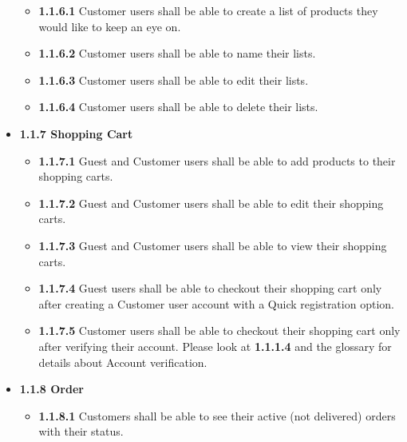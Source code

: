 \documentclass[]{article}
\providecommand{\tightlist}{%
  \setlength{\itemsep}{0pt}\setlength{\parskip}{0pt}}
\begin{document}
\begin{itemize}
          \begin{itemize}
              \tightlist
              \item
                    \textbf{1.1.6.1} Customer users shall be able to create a list of
                    products they would like to keep an eye on.
              \item
                    \textbf{1.1.6.2} Customer users shall be able to name their lists.
              \item
                    \textbf{1.1.6.3} Customer users shall be able to edit their lists.
              \item
                    \textbf{1.1.6.4} Customer users shall be able to delete their lists.
          \end{itemize}
    \item
          \textbf{1.1.7 Shopping Cart}

          \begin{itemize}
              \tightlist
              \item
                    \textbf{1.1.7.1} Guest and Customer users shall be able to add
                    products to their shopping carts.
              \item
                    \textbf{1.1.7.2} Guest and Customer users shall be able to edit
                    their shopping carts.
              \item
                    \textbf{1.1.7.3} Guest and Customer users shall be able to view
                    their shopping carts.
              \item
                    \textbf{1.1.7.4} Guest users shall be able to checkout their
                    shopping cart only after creating a Customer user account with a
                    Quick registration option.
              \item
                    \textbf{1.1.7.5} Customer users shall be able to checkout their
                    shopping cart only after verifying their account. Please look at
                    \textbf{1.1.1.4} and the glossary for details about Account
                    verification.
          \end{itemize}
    \item
          \textbf{1.1.8 Order}

          \begin{itemize}
              \item
                    \textbf{1.1.8.1} Customers shall be able to see their active (not
                    delivered) orders with their status.


\end{itemize}
\end{itemize}
\end{document}
